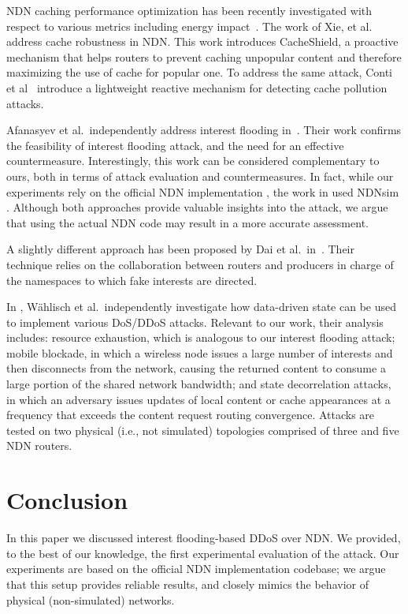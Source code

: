 \documentclass[10pt,conference,letterpaper]{IEEEtran}
\begin{document}
NDN caching performance optimization has been recently investigated 
with respect  to various metrics including energy
impact~\cite{VanSmBriPlStThBra09-Voice,approximate,greening}.
The work of Xie, et
al.~\cite{enhancing-cache-robustness}
address cache
robustness in NDN. This work introduces CacheShield, a proactive
mechanism that helps routers to prevent caching unpopular content and
therefore maximizing the use of cache for popular one.
To address the same attack, Conti et al~\cite{ContiGT13} introduce a lightweight reactive mechanism 
for detecting cache pollution attacks. 

Afanasyev et al.~independently address interest flooding in~\cite{ErsinIFIPNetworking}.
Their work confirms the feasibility of interest flooding attack, and the need for an effective 
countermeasure. Interestingly, this work can be considered complementary to ours, both in terms of 
attack evaluation and countermeasures. In fact, while our experiments rely on the official NDN 
implementation \cite{CCNx}, the work in \cite{ErsinIFIPNetworking} used NDNsim \cite{uclasim}.
Although both approaches provide valuable insights into the attack, we argue that using the actual 
NDN code may result in a more accurate assessment.

A slightly different approach has been proposed by Dai et al.~in~\cite{NOMENDai}. Their technique 
relies on the collaboration between routers and producers in charge of the namespaces to which fake interests are directed. 

In \cite{WahlishSV12}, W\"ahlisch et al.~independently investigate how data-driven state can be 
used to implement various DoS/DDoS attacks. Relevant to our work, their analysis 
includes: 
resource exhaustion, which is analogous to our interest flooding attack;  
mobile blockade, in which a wireless node issues a large number of interests and then disconnects 
from the network, causing the returned content to consume a large portion of the shared network 
bandwidth;
and state decorrelation attacks, in which an adversary issues updates of local content or cache 
appearances at a frequency that exceeds the content request routing convergence. 
Attacks are tested on two physical (i.e., not simulated) topologies 
comprised of three and five NDN routers.




\section{Conclusion}
\label{sec:conclusion}
In this paper we discussed interest flooding-based DDoS over NDN. We provided, to the best of our knowledge, the first experimental evaluation of the attack. Our experiments are based on the official NDN implementation codebase; we argue that this setup provides reliable results, and closely mimics the behavior of physical (non-simulated) networks. 
\end{document}
